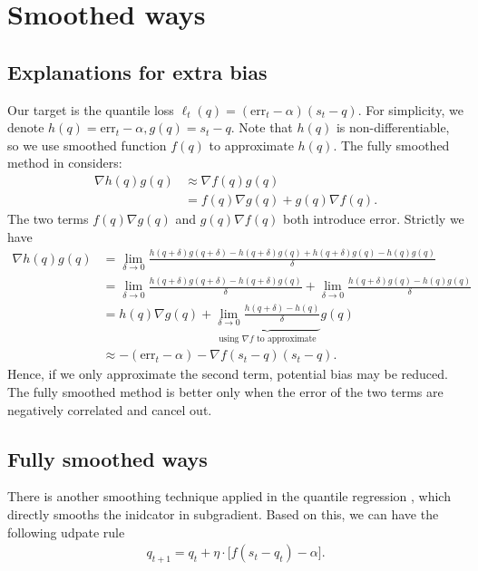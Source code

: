 \appendix
\section{Smoothed ways}
\subsection{Explanations for extra bias}
\label{explanations for extra bias}
Our target is the quantile loss $\ell_t(q)=(\text{err}_t-\alpha)(s_t-q)$.
For simplicity, we denote $h(q)=\text{err}_t-\alpha, g(q)=s_t-q$. Note that $h(q)$ is non-differentiable, so we use smoothed function $f(q)$ to approximate $h(q)$. The fully smoothed method in  considers:
\begin{align*}
    \nabla h(q)g(q)&\approx\nabla f(q)g(q)\\
    &=f(q)\nabla g(q)+g(q)\nabla f(q).
\end{align*}
The two terms $f(q)\nabla g(q)$ and $g(q)\nabla f(q)$ both introduce error. Strictly we have
\begin{align*}
\nabla h(q)g(q)&=\lim_{\delta\to 0} \frac{h(q+\delta)g(q+\delta)-h(q+\delta)g(q)+h(q+\delta)g(q)-h(q)g(q)}{\delta}\\
&=\lim_{\delta\to 0} \frac{h(q+\delta)g(q+\delta)-h(q+\delta)g(q)}{\delta}+\lim_{\delta\to 0} \frac{h(q+\delta)g(q)-h(q)g(q)}{\delta}\\
&=h(q)\nabla g(q)+\underbrace{\lim_{\delta\to 0}\frac{h(q+\delta)-h(q)}{\delta}}_{\text{ using $\nabla f$ to approximate  }} g(q)\\
&\approx -(\text{err}_t-\alpha)-\nabla f(s_t-q)(s_t-q).
\end{align*}
Hence, if we only approximate the second term, potential bias may be reduced. The fully smoothed method is better only when the error of the two terms are negatively correlated and cancel out. 

\subsection{Fully smoothed ways}
\label{full-smoothed way}
There is another smoothing technique applied in the quantile regression \citep{fernandes2021smoothing,tan2022high}, which directly smooths the inidcator in subgradient. Based on this, we can have the following udpate rule
\begin{align}\label{eq:conv_smoothed_rule}
    q_{t+1} = q_t + \eta \cdot \big[f(s_t-q_t) - \alpha \big].
\end{align}

